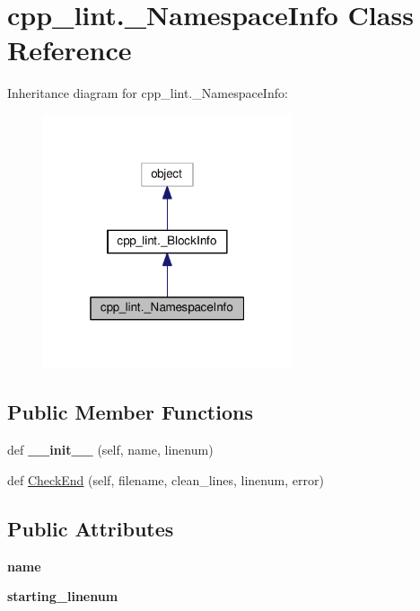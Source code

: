 \hypertarget{classcpp__lint_1_1___namespace_info}{}\section{cpp\+\_\+lint.\+\_\+\+Namespace\+Info Class Reference}
\label{classcpp__lint_1_1___namespace_info}


Inheritance diagram for cpp\+\_\+lint.\+\_\+\+Namespace\+Info\+:
\nopagebreak
\begin{figure}[H]
\begin{center}
\leavevmode
\includegraphics[width=208pt]{classcpp__lint_1_1___namespace_info__inherit__graph}
\end{center}
\end{figure}
\subsection*{Public Member Functions}
\begin{DoxyCompactItemize}
\item 
\mbox{\label{classcpp__lint_1_1___namespace_info_aee52a8fcfd92a2bfaab356753e702377}} 
def {\bfseries \+\_\+\+\_\+init\+\_\+\+\_\+} (self, name, linenum)
\item 
def \mbox{\hyperlink{classcpp__lint_1_1___namespace_info_ad119120161c94fea85e4152b563f15c6}{Check\+End}} (self, filename, clean\+\_\+lines, linenum, error)
\end{DoxyCompactItemize}
\subsection*{Public Attributes}
\begin{DoxyCompactItemize}
\item 
\mbox{\label{classcpp__lint_1_1___namespace_info_a76fa953b9f7af77672a89f279e860c37}} 
{\bfseries name}
\item 
\mbox{\label{classcpp__lint_1_1___namespace_info_ae2191919b3c07171e1653b0858b28f67}} 
{\bfseries starting\+\_\+linenum}
\end{DoxyCompactItemize}


